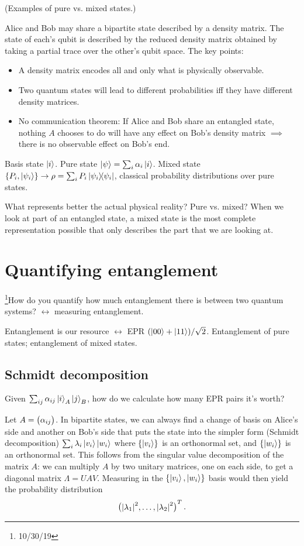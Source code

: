 \documentclass[12pt]{article}
\begin{document}
(Examples of pure vs. mixed states.)

Alice and Bob may share a bipartite state described by a density matrix. The
state of each's qubit is described by the reduced density matrix obtained by
taking a partial trace over the other's qubit space. The key points:
\begin{itemize}
    \item A density matrix encodes all and only what is physically observable.
    \item Two quantum states will lead to different probabilities iff they have
        different density matrices.
    \item No communication theorem: If Alice and Bob share an entangled state,
        nothing $A$ chooses to do will have any effect on Bob's density matrix
        $\implies$ there is no observable effect on Bob's end.
\end{itemize}

Basis state $\ket{i}$. Pure state $\ket{\psi} = \sum_i \alpha_i \ket{i}$. Mixed
state $\{P_i, \ket{\psi_i}\} \rightarrow \rho = \sum_i P_i \ketbra{\psi_i}$,
classical probability distributions over pure states.

What represents better the actual physical reality? Pure vs. mixed? When we
look at part of an entangled state, a mixed state is the most complete
representation possible that only describes the part that we are looking at.


\section{Quantifying entanglement}
\footnote{10/30/19}How do you quantify how much entanglement there is between
two quantum systems? $\leftrightarrow$ measuring entanglement.

Entanglement is our resource $\leftrightarrow$ EPR $(\ket{00} +
\ket{11})/\sqrt{2}$. Entanglement of pure states; entanglement of mixed states.

\subsection{Schmidt decomposition}
Given $\sum_{ij}\alpha_{ij}\ket{i}_A\ket{j}_B$, how do we calculate how many
EPR pairs it's worth?

Let $A = \pmqty{\alpha_{ij}}$. In bipartite states, we can always find a change
of basis on Alice's side and another on Bob's side that puts the state into the
simpler form (Schmidt decomposition) $\sum_i \lambda_i \ket{v_i}\ket{w_i}$
where $\{\ket{v_i}\}$ is an orthonormal set, and $\{\ket{w_i}\}$ is an
orthonormal set. This follows from the singular value decomposition of the
matrix $A$: we can multiply $A$ by two unitary matrices, one on each side, to
get a diagonal matrix $\Lambda = UAV$. Measuring in the $\{\ket{v_i},
\ket{w_i}\}$ basis would then yield the probability distribution
\begin{equation}
    \pmqty{\abs{\lambda_1}^2, \ldots, \abs{\lambda_2}^2}^T.
    \label{eq:probability-distribution}
\end{equation}
\end{document}
